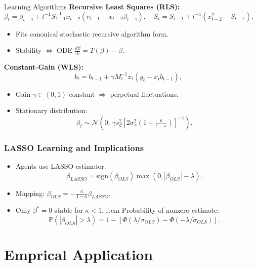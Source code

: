 \documentclass[compress,12pt]{beamer}
\begin{document}
\begin{frame}{Learning Algorithms}
\textbf{Recursive Least Squares (RLS):}
\[
\beta_t = \beta_{t-1} + t^{-1} S^{-1}_{t-1} x_{t-2}(r_{t-1}-x_{t-2}\beta_{t-1}),
\quad
S_t = S_{t-1} + t^{-1}(x_{t-2}^2 - S_{t-1}).
\]
\begin{itemize}
    \item Fits canonical stochastic recursive algorithm form.
    \item Stability $\Leftrightarrow$ ODE 
    \( \frac{d\beta}{d\tau} = T(\beta)-\beta \).
\end{itemize}
\vspace{0.5em}
\textbf{Constant-Gain (WLS):}
\[
b_t = b_{t-1} + \gamma M_t^{-1}x_t(y_t - x_t b_{t-1}),
\]
\begin{itemize}
    \item Gain $\gamma \in (0,1)$ constant $\Rightarrow$ perpetual fluctuations.
    \item Stationary distribution:
    \[
    \beta_t \sim \mathcal{N}\left(0,\, \gamma s_d^2 [2\sigma_x^2(1+\tfrac{\kappa}{1-\kappa})]^{-1}\right).
    \]
\end{itemize}
\end{frame}

\begin{frame}
    \frametitle{LASSO Learning and Implications}
   \begin{itemize}
    \item Agents use LASSO estimator:
    \[
    {\beta}_{LASSO}
    = \text{sign}(\beta_{OLS})\max(0,|\beta_{OLS}| - \lambda).
    \]

    \item Mapping: \( \beta_{OLS} = -\frac{\kappa}{1-\kappa}\beta_{LASSO}. \)
    \item Only $\beta^*=0$ stable for $\kappa<1$.
    item Probability of nonzero estimate:
    \[
    \mathbb{P}(|\beta_{OLS}|>\lambda)
    = 1 - [\Phi(\lambda/\sigma_{OLS}) - \Phi(-\lambda/\sigma_{OLS})].
    \]
    
\end{itemize}

\end{frame}

\section{Emprical Application}
\end{document}
